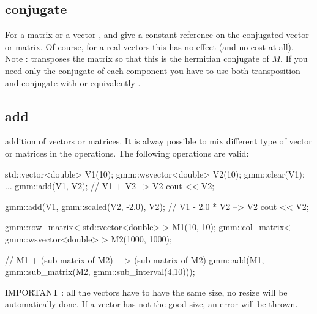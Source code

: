 \documentclass[11pt,a4paper]{article}
\begin{document}
\subsection{conjugate}

For a matrix  or a vector , 
 and  give a constant reference on the conjugated vector or matrix. Of course, for a real vectors this has no effect (and no cost at all). Note :  transposes the matrix  so that this is the hermitian conjugate of $M$. If you need only the conjugate of each component you have to use both transposition and conjugate with  or equivalently  .


\subsection{add}
addition of vectors or matrices. It is alway possible to mix different type of vector or matrices in the operations. The following operations are valid:
\begin{cppcode}
  std::vector<double> V1(10);
  gmm::wsvector<double> V2(10);
  gmm::clear(V1);
  ...
  gmm::add(V1, V2); // V1 + V2 --> V2
  cout << V2;

  gmm::add(V1, gmm::scaled(V2, -2.0), V2); // V1 - 2.0 * V2 --> V2
  cout << V2;

  gmm::row_matrix< std::vector<double> > M1(10, 10);
  gmm::col_matrix< gmm::wsvector<double> > M2(1000, 1000);

  // M1 + (sub matrix of M2) ---> (sub matrix of M2)
  gmm::add(M1, gmm::sub_matrix(M2, gmm::sub_interval(4,10)));
\end{cppcode}

IMPORTANT : all the vectors have to have the same size, no resize will be automatically done. If a vector has not the good size, an error will be thrown.
\end{document}
